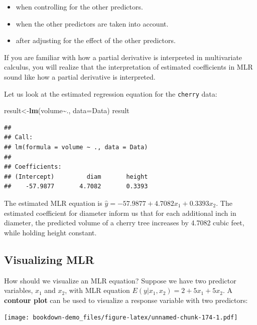 \documentclass[
]{book}
\newenvironment{Shaded}{\begin{snugshade}}{\end{snugshade}}
\newcommand{\AttributeTok}[1]{\textcolor[rgb]{0.13,0.29,0.53}{#1}}
\newcommand{\FunctionTok}[1]{\textcolor[rgb]{0.13,0.29,0.53}{\textbf{#1}}}
\newcommand{\NormalTok}[1]{#1}
\newcommand{\OtherTok}[1]{\textcolor[rgb]{0.56,0.35,0.01}{#1}}
\newcommand{\SpecialCharTok}[1]{\textcolor[rgb]{0.81,0.36,0.00}{\textbf{#1}}}
\providecommand{\tightlist}{%
  \setlength{\itemsep}{0pt}\setlength{\parskip}{0pt}}
\begin{document}
\begin{itemize}
\tightlist
\item
  when controlling for the other predictors.
\item
  when the other predictors are taken into account.
\item
  after adjusting for the effect of the other predictors.
\end{itemize}

If you are familiar with how a partial derivative is interpreted in multivariate calculus, you will realize that the interpretation of estimated coefficients in MLR sound like how a partial derivative is interpreted.

Let us look at the estimated regression equation for the \texttt{cherry} data:

\begin{Shaded}
\begin{Highlighting}[]
\NormalTok{result}\OtherTok{\textless{}{-}}\FunctionTok{lm}\NormalTok{(volume}\SpecialCharTok{\textasciitilde{}}\NormalTok{., }\AttributeTok{data=}\NormalTok{Data)}
\NormalTok{result}
\end{Highlighting}
\end{Shaded}

\begin{verbatim}
## 
## Call:
## lm(formula = volume ~ ., data = Data)
## 
## Coefficients:
## (Intercept)         diam       height  
##    -57.9877       4.7082       0.3393
\end{verbatim}

The estimated MLR equation is \(\hat{y} = -57.9877 + 4.7082x_1 + 0.3393x_2\). The estimated coefficient for diameter inform us that for each additional inch in diameter, the predicted volume of a cherry tree increases by 4.7082 cubic feet, while holding height constant.

\hypertarget{visualizing-mlr}{%
\subsection{Visualizing MLR}\label{visualizing-mlr}}

How should we visualize an MLR equation? Suppose we have two predictor variables, \(x_1\) and \(x_2\), with MLR equation \(E(y|x_1,x_2) = 2 + 5x_1 + 5x_2\). A \textbf{contour plot} can be used to visualize a response variable with two predictors:

\texttt{[image: bookdown-demo\_files/figure-latex/unnamed-chunk-174-1.pdf]}
\end{document}
